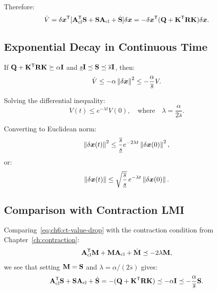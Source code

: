 Therefore:
\begin{equation}
\dot{V} = \delta\bm{x}^{\mathsf{T}}[\mathbf{A}_{\text{cl}}^{\mathsf{T}}\mathbf{S} + \mathbf{S}\mathbf{A}_{\text{cl}} + \dot{\mathbf{S}}]\delta\bm{x}
        = -\delta\bm{x}^{\mathsf{T}}(\mathbf{Q} + \mathbf{K}^{\mathsf{T}}\mathbf{R}\mathbf{K})\delta\bm{x}.
\label{eq:ch6:ct-value-drop}
\end{equation}

\subsection{Exponential Decay in Continuous Time}

If $\mathbf{Q} + \mathbf{K}^{\mathsf{T}}\mathbf{R}\mathbf{K} \succeq \alpha\mathbf{I}$ and $\underline{s}\mathbf{I} \preceq \mathbf{S} \preceq \overline{s}\mathbf{I}$, then:
\begin{equation}
\dot{V} \leq -\alpha\left\lVert \delta\bm{x} \right\rVert^2 \leq -\frac{\alpha}{\overline{s}}V.
\label{eq:ch6:ct-decay-ineq}
\end{equation}

Solving the differential inequality:
\begin{equation}
V(t) \leq e^{-\lambda t}V(0), \quad \text{where} \quad \lambda = \frac{\alpha}{2\overline{s}}.
\label{eq:ch6:ct-exp-decay}
\end{equation}

Converting to Euclidean norm:
\begin{equation}
\left\lVert \delta\bm{x}(t) \right\rVert^2 \leq \frac{\overline{s}}{\underline{s}}e^{-2\lambda t}\left\lVert \delta\bm{x}(0) \right\rVert^2,
\label{eq:ch6:ct-euclidean-decay}
\end{equation}
or:
\begin{equation}
\left\lVert \delta\bm{x}(t) \right\rVert \leq \sqrt{\frac{\overline{s}}{\underline{s}}} \, e^{-\lambda t}\left\lVert \delta\bm{x}(0) \right\rVert.
\label{eq:ch6:ct-norm-decay-final}
\end{equation}

\subsection{Comparison with Contraction LMI}

Comparing~\eqref{eq:ch6:ct-value-drop} with the contraction condition from Chapter~\ref{ch:contraction}:
\begin{equation}
\mathbf{A}_{\text{cl}}^{\mathsf{T}}\mathbf{M} + \mathbf{M}\mathbf{A}_{\text{cl}} + \dot{\mathbf{M}} \preceq -2\lambda\mathbf{M},
\label{eq:ch6:contraction-lmi}
\end{equation}
we see that setting $\mathbf{M} = \mathbf{S}$ and $\lambda = \alpha/(2\overline{s})$ gives:
\begin{equation}
\mathbf{A}_{\text{cl}}^{\mathsf{T}}\mathbf{S} + \mathbf{S}\mathbf{A}_{\text{cl}} + \dot{\mathbf{S}}
= -(\mathbf{Q} + \mathbf{K}^{\mathsf{T}}\mathbf{R}\mathbf{K})
\preceq -\alpha\mathbf{I}
\preceq -\frac{\alpha}{\overline{s}}\mathbf{S}.
\label{eq:ch6:contraction-satisfied}
\end{equation}

